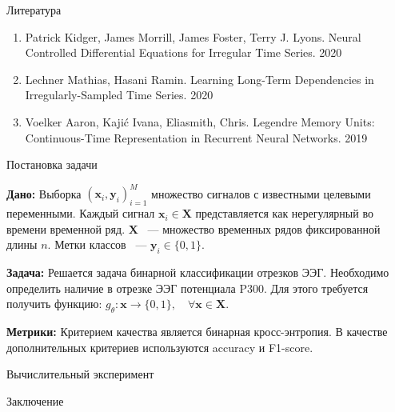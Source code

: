 \documentclass{beamer}
\begin{document}
\begin{frame}{Литература}

    \begin{enumerate}
        \item Patrick Kidger, James Morrill, James Foster, Terry J. Lyons. {\color{blue} Neural Controlled Differential Equations for Irregular Time Series}. 2020
        \item Lechner Mathias, Hasani Ramin. {\color{blue} Learning Long-Term Dependencies in Irregularly-Sampled Time Series}. 2020
        \item Voelker Aaron, Kaji\'{c} Ivana, Eliasmith, Chris. {\color{blue} Legendre Memory Units: Continuous-Time Representation in Recurrent Neural Networks}. 2019
    \end{enumerate}
    
\end{frame}
\begin{frame}{Постановка задачи}
\begin{alertblock}{}
        \textbf{Дано:} Выборка $ {(\mathbf{x}_i , \mathbf{y}_i )}_{i=1}^M$ множество сигналов с известными целевыми переменными. Каждый сигнал $\mathbf{x}_i \in \mathbf{X}$ представляется как нерегулярный во времени временной ряд. $\mathbf{X}$ ~--- множество временных рядов фиксированной длины $n$.  Метки классов ~--- $\mathbf{y}_i\in\{0, 1\}$.
	\end{alertblock}
	
	\begin{alertblock}{}
		\textbf{Задача:} Решается задача бинарной классификации отрезков ЭЭГ. Необходимо определить наличие в отрезке ЭЭГ потенциала P300. Для этого требуется получить функцию: $g_{\theta}: \mathbf{x} \to \{0, 1\}, \quad \forall \mathbf{x} \in \mathbf{X}$.
	\end{alertblock}
	
	\begin{alertblock}{}
        \textbf{Метрики:} Критерием качества является бинарная кросс-энтропия. В качестве дополнительных критериев используются accuracy и F1-score. 
	\end{alertblock}

\end{frame}
\begin{frame}{Вычислительный эксперимент}



\end{frame}
\begin{frame}{Заключение}
    
\end{frame}
\end{document}
